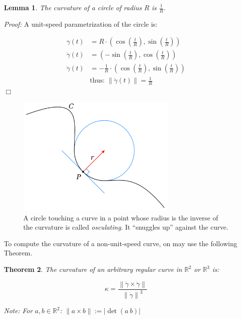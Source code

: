\documentclass[a4paper,11pt,notitlepage,fullpage]{paper}
\newcommand{\dy}{\dot\gamma}
\newcommand{\ddy}{\ddot\gamma}
\theoremstyle{plain}
\newtheorem{thm}{Theorem}[section] %
\newtheorem{lem}[thm]{Lemma}
\theoremstyle{definition}
\begin{document}
\begin{lem}
The curvature of a circle of radius $R$ is $\frac{1}{R}$.
\end{lem}

\emph{Proof:} A unit-speed parametrization of the circle is:

\begin{align*}
\gamma(t) &= R \cdot \left(\cos\left(\frac{t}{R}\right), \sin\left(\frac{t}{R}\right)\right) \\
\dot\gamma(t) &= \left(-\sin\left(\frac{t}{R}\right), \cos\left(\frac{t}{R}\right)\right) \\
\ddot\gamma(t) &= -\frac{1}{R} \cdot \left(\cos\left(\frac{t}{R}\right), \sin\left(\frac{t}{R}\right)\right) \\
&\text{thus: } \left\|\ddot\gamma(t)\right\| = \frac{1}{R} 
\end{align*}
\hfill $\Box$

\begin{figure}[H]
\centering
\includegraphics[width = 0.7\textwidth]{img/schmiegekreis}
\caption{A circle touching a curve in a point whose radius is the inverse of the curvature is called \emph{osculating}. It ``snuggles up'' against the curve.}
\label{fig:schmiegekreis}
\end{figure}


To compute the curvature of a non-unit-speed curve, on may use the following Theorem.

\begin{thm}
\label{thm:curvature_arbitrary_curve}
The curvature of an arbitrary regular curve in $\mathbb R^2$ or $\mathbb R^3$ is:

\begin{equation*}
\kappa = \frac{\left\|\dy \times \ddy\right\|}{\left\|\dy\right\|^3}
\end{equation*}

Note: For $a, b \in \mathbb R^2$: $\|a \times b\| := |\det(a~b)|$
\end{thm}
\end{document}
